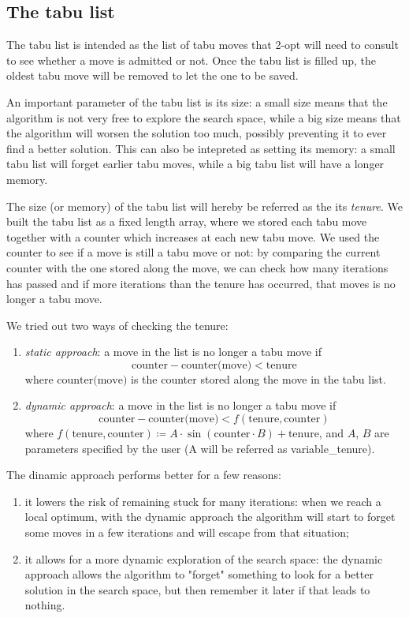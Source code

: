 \subsection{The tabu list}

The tabu list is intended as the list of tabu moves that 2-opt will need to consult to see whether a move is admitted or not. Once the tabu list is filled up, the oldest tabu move will be removed to let the one to be saved.

An important parameter of the tabu list is its size: a small size means that the algorithm is not very free to explore the search space, while a big size means that the algorithm will worsen the solution too much, possibly preventing it to ever find a better solution. This can also be intepreted as setting its memory: a small tabu list will forget earlier tabu moves, while a big tabu list will have a longer memory.

The size (or memory) of the tabu list will hereby be referred as the its \textit{tenure}. We built the tabu list as a fixed length array, where we stored each tabu move together with a counter which increases at each new tabu move. We used the counter to see if a move is still a tabu move or not: by comparing the current counter with the one stored along the move, we can check how many iterations has passed and if more iterations than the tenure has occurred, that moves is no longer a tabu move.

We tried out two ways of checking the tenure:

\begin{enumerate}
    \item \textit{static approach}: a move in the list is no longer a tabu move if
    $$\text{counter}-\text{counter(move)} < \text{tenure}$$
    where $\text{counter(move)}$ is the counter stored along the move in the tabu list.
    \item \textit{dynamic approach}: a move in the list is no longer a tabu move if
    $$\text{counter}-\text{counter(move)} < f(\text{tenure}, \text{counter})$$
    where $f(\text{tenure},\text{counter})\coloneq A\cdot\sin(\text{counter}\cdot B) + \text{tenure}$, and $A$, $B$ are parameters specified by the user (A will be referred as variable\_tenure).
\end{enumerate}

The dinamic approach performs better for a few reasons:

\begin{enumerate}
    \item it lowers the risk of remaining stuck for many iterations: when we reach a local optimum, with the dynamic approach the algorithm will start to forget some moves in a few iterations and will escape from that situation;
    \item it allows for a more dynamic exploration of the search space: the dynamic approach allows the algorithm to "forget" something to look for a better solution in the search space, but then remember it later if that leads to nothing.
\end{enumerate}

